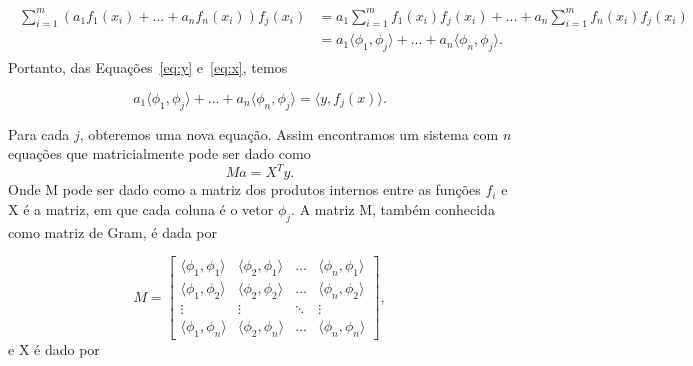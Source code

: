 \documentclass[
	12pt,				%
    oneside,			%
	a4paper,			%
	english,			%
	french,				%
	spanish,			%
	brazil,				%
	]{abntex2}
\begin{document}
            \begin{align}
                \label{eq:x}
                \begin{split}
                    \sum\limits_{i=1}^m (a_{1}f_{1}(x_i) + ... + a_{n}f_{n}(x_i))f_{j}(x_i) &= a_{1}\sum\limits_{i=1}^m  f_{1}(x_i)f_{j}(x_i) + ... + a_{n}\sum\limits_{i=1}^m f_{n}(x_i)f_{j}(x_i) \\
                    &= a_{1}\langle \phi_{1}, \phi_{j} \rangle + ... + a_{n}\langle \phi_{n}, \phi_{j} \rangle.
                \end{split}
            \end{align}
            Portanto, das Equações~\eqref{eq:y} e~\eqref{eq:x}, temos

            \begin{equation*}
                a_{1}\langle \phi_{1}, \phi_{j} \rangle + ... + a_{n}\langle \phi_{n}, \phi_{j} \rangle = \langle y, f_{j}(x) \rangle.
            \end{equation*}

            Para cada $j$, obteremos uma nova equação. Assim encontramos um sistema com $n$ equações que matricialmente pode ser dado como
            \begin{equation}
                Ma = X^{T}y.
            \end{equation}
            Onde M pode ser dado como a matriz dos produtos internos entre as funções $f_{i}$ e X é a matriz, em que cada coluna é o vetor $\phi_{j}$. A matriz M, também conhecida como matriz de Gram, é dada por

            \begin{equation*}
                M = \begin{bmatrix}
                \langle \phi_{1}, \phi_{1} \rangle & \langle \phi_{2}, \phi_{1} \rangle & \dots  & \langle \phi_{n}, \phi_{1} \rangle \\
                \langle \phi_{1}, \phi_{2} \rangle & \langle \phi_{2}, \phi_{2} \rangle & \dots  & \langle \phi_{n}, \phi_{2} \rangle \\
                \vdots & \vdots & \ddots & \vdots \\
                \langle \phi_{1}, \phi_{n} \rangle & \langle \phi_{2}, \phi_{n} \rangle & \dots  & \langle \phi_{n}, \phi_{n} \rangle
                \end{bmatrix},
            \end{equation*}
            e X é dado por
\end{document}

